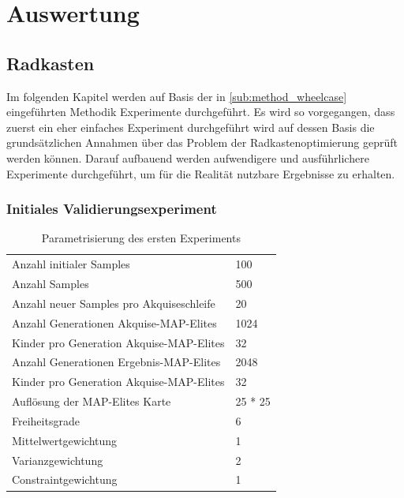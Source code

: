 \section{Auswertung}

\subsection{Radkasten}

Im folgenden Kapitel werden auf Basis der in \ref{sub:method_wheelcase} eingeführten Methodik Experimente durchgeführt.
Es wird so vorgegangen, dass zuerst ein eher einfaches Experiment durchgeführt wird auf dessen Basis die grundsätzlichen Annahmen über das Problem der Radkastenoptimierung geprüft werden können.
Darauf aufbauend werden aufwendigere und ausführlichere Experimente durchgeführt, um für die Realität nutzbare Ergebnisse zu erhalten.

\subsubsection{Initiales Validierungsexperiment}
\label{sub:exp1st}
\begin{table}[h]
	\centering
	\begin{tabularx}{.75\textwidth}{ll}\hline
		Anzahl initialer Samples & 100 \\
		Anzahl Samples & 500 \\
		Anzahl neuer Samples pro Akquiseschleife & 20 \\
		Anzahl Generationen Akquise-MAP-Elites & 1024 \\
		Kinder pro Generation Akquise-MAP-Elites & 32 \\
		Anzahl Generationen Ergebnis-MAP-Elites & 2048 \\
		Kinder pro Generation Akquise-MAP-Elites & 32 \\
		Auflösung der MAP-Elites Karte & 25 * 25  \\
		\hline
		Freiheitsgrade & 6 \\
		Mittelwertgewichtung & 1 \\
		Varianzgewichtung & 2 \\
		Constraintgewichtung & 1 \\
	\end{tabularx}
	\caption{Parametrisierung des ersten Experiments}
	\label{tab:param1st}
\end{table}

